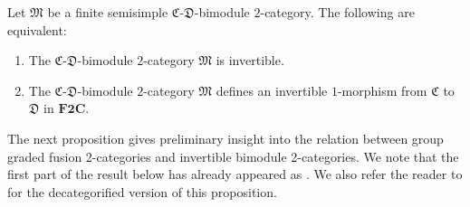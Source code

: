 \begin{Proposition}\label{prop:invertibilitycharacterization}
Let $\mathfrak{M}$ be a finite semisimple $\mathfrak{C}$-$\mathfrak{D}$-bimodule $2$-category. The following are equivalent:
\begin{enumerate}\itemsep=0pt
 \item[$(1)$] The $\mathfrak{C}$-$\mathfrak{D}$-bimodule $2$-category $\mathfrak{M}$ is invertible.
 \item[$(2)$] The $\mathfrak{C}$-$\mathfrak{D}$-bimodule $2$-category $\mathfrak{M}$ defines an invertible $1$-morphism from $\mathfrak{C}$ to $\mathfrak{D}$ in $\mathbf{F2C}$.
\end{enumerate}
\end{Proposition}

The next proposition gives preliminary insight into the relation between group graded fusion 2-categories and invertible bimodule 2-categories. We note that the first part of the result below has already appeared as \cite[Proposition~3.1.7]{DY23}. We also refer the reader to \cite[Theorem~6.1]{ENO2} for the decategorified version of this proposition.

